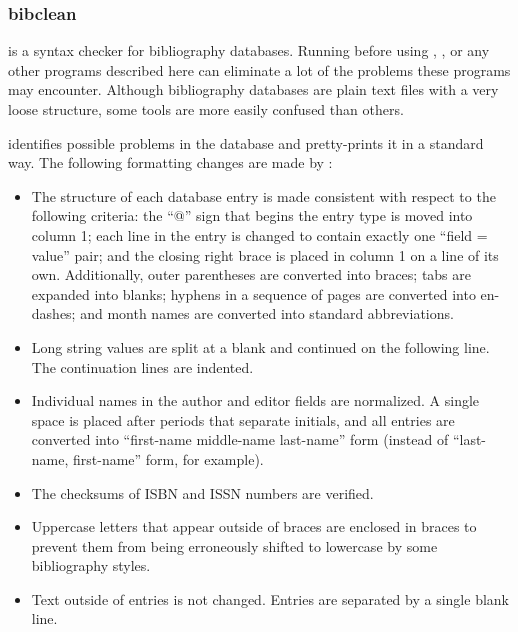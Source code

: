 \subsubsection{bibclean}

 is a syntax checker for bibliography
databases.  Running  before using ,
, or any other programs described here can eliminate a lot of
the problems these programs may encounter.  Although bibliography databases
are plain text files with a very loose structure, some tools are more easily
confused than others.

 identifies possible problems in the database and
pretty-prints it in a standard way.  The following formatting changes
are made by :

\begin{itemize}
  \item The structure of each database entry is made consistent with 
        respect to the following criteria: the ``@'' sign that begins
        the entry type is moved into column 1; each line in the entry
        is changed to contain exactly one ``field = value'' pair; and
        the closing right brace is placed in column 1 on a line of
        its own.  Additionally, outer parentheses are converted into
        braces; tabs are expanded into blanks; hyphens in a sequence
        of pages are converted into en-dashes; and month names are converted
        into standard abbreviations.

  \item Long string values are split at a blank and continued on the following
        line.  The continuation lines are indented.

  \item Individual names in the author and editor fields are 
        normalized.  A single space is placed after periods that separate
        initials, and all entries are converted into ``first-name middle-name
        last-name'' form (instead of ``last-name, first-name'' form, for 
        example).

  \item The checksums of ISBN and ISSN numbers are verified.

\newpage
  \item Uppercase letters that appear outside of braces are enclosed in
        braces to prevent them from being erroneously shifted to lowercase
        by some bibliography styles.

  \item Text outside of entries is not changed.  Entries are separated by
        a single blank line.
\end{itemize}

